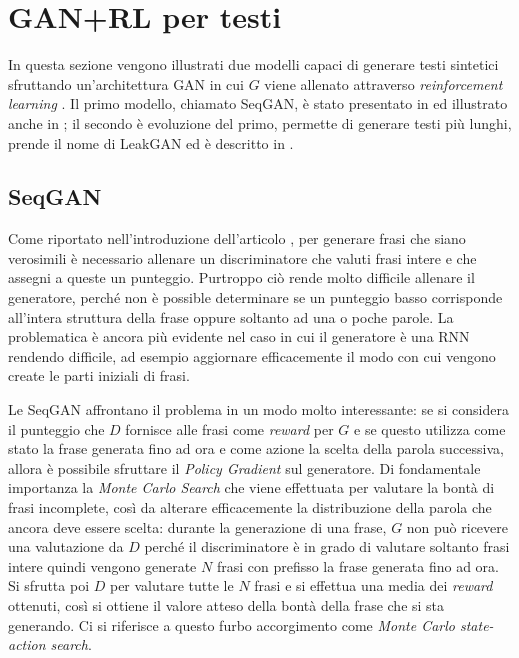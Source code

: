 

\section{GAN+RL per testi}
In questa sezione vengono illustrati due modelli capaci di generare testi sintetici sfruttando un'architettura GAN in cui $G$ viene allenato attraverso \emph{reinforcement learning} .
Il primo modello, chiamato SeqGAN, è stato presentato in \cite{SeqGAN} ed illustrato anche in \cite{GAN_for_text}; il secondo è evoluzione del primo, permette di generare testi più lunghi, prende il nome di LeakGAN ed è descritto in \cite{LeakGAN}.

\subsection{SeqGAN}
Come riportato nell'introduzione dell'articolo \cite{SeqGAN}, per generare frasi che siano verosimili è necessario allenare un discriminatore che valuti frasi intere e che assegni a queste un punteggio.
Purtroppo ciò rende molto difficile allenare il generatore, perché non è possible determinare se un punteggio basso corrisponde all'intera struttura della frase oppure soltanto ad una o poche parole.
La problematica è ancora più evidente nel caso in cui il generatore è una RNN 
rendendo difficile, ad esempio aggiornare efficacemente il modo con cui vengono create le parti iniziali di frasi.

Le SeqGAN affrontano il problema in un modo molto interessante: se si considera il punteggio che $D$ fornisce alle frasi come \emph{reward} per $G$ e se questo utilizza come stato la frase generata fino ad ora e come azione la scelta della parola successiva, allora è possibile sfruttare il \emph{Policy Gradient} sul generatore.
Di fondamentale importanza la \emph{Monte Carlo Search} che viene effettuata per valutare la bontà di frasi incomplete, così da alterare efficacemente la distribuzione della parola che ancora deve essere scelta: 
durante la generazione di una frase, $G$ non può ricevere una valutazione da $D$ perché il discriminatore è in grado di valutare soltanto frasi intere %
quindi vengono generate $N$ frasi con prefisso la frase generata fino ad ora.
Si sfrutta poi $D$ per valutare tutte le $N$ frasi e si effettua una media dei \emph{reward} ottenuti, così si ottiene il valore atteso della bontà della frase che si sta generando.
Ci si riferisce a questo furbo accorgimento come \emph{Monte Carlo state-action search}.

